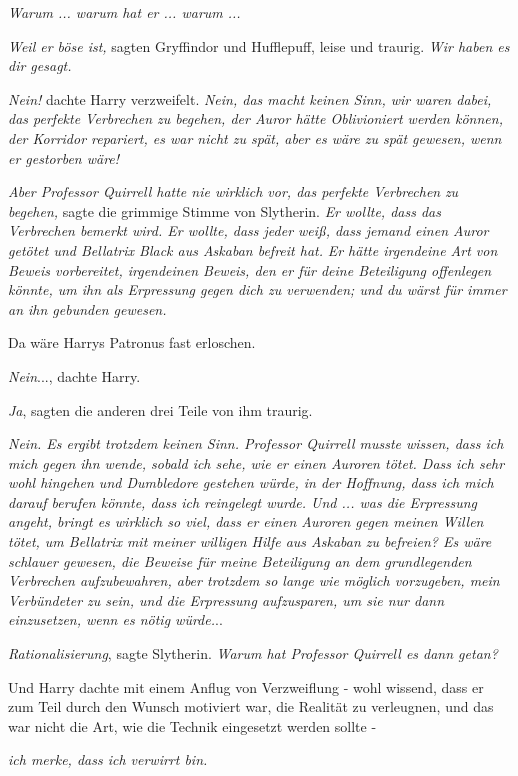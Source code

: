 \emph{Warum ... warum hat er ... warum ...}

\emph{Weil er böse ist,} sagten Gryffindor und Hufflepuff, leise und traurig.
\emph{Wir haben es dir gesagt.}

\emph{Nein!} dachte Harry verzweifelt. \emph{Nein, das macht keinen Sinn, wir
waren dabei, das perfekte Verbrechen zu begehen, der Auror hätte Oblivioniert
werden können, der Korridor repariert, es war nicht zu spät, aber es wäre zu
spät gewesen, wenn er gestorben wäre!}

\emph{Aber Professor Quirrell hatte nie wirklich vor, das perfekte Verbrechen}
\emph{zu begehen,} sagte die grimmige Stimme von Slytherin. \emph{Er wollte,
dass das Verbrechen bemerkt wird. Er wollte, dass jeder weiß, dass jemand einen
Auror getötet und Bellatrix Black aus Askaban befreit hat.} \emph{Er hätte
irgendeine Art von} \emph{Beweis vorbereitet, irgendeinen Beweis, den er für
deine Beteiligung offenlegen könnte, um ihn als Erpressung gegen dich zu
verwenden; und du wärst für immer an ihn gebunden gewesen.}

Da wäre Harrys Patronus fast erloschen.

\emph{Nein}..., dachte Harry.

\emph{Ja}, sagten die anderen drei Teile von ihm traurig.

\emph{Nein. Es ergibt trotzdem keinen Sinn. Professor Quirrell musste wissen,
dass ich mich gegen ihn wende, sobald ich sehe, wie er einen Auroren tötet. Dass
ich sehr wohl hingehen und Dumbledore gestehen würde, in der Hoffnung, dass ich
mich darauf berufen könnte, dass ich reingelegt wurde. Und ... was die Erpressung
angeht, bringt es wirklich so viel, dass er einen Auroren gegen meinen Willen
tötet, um Bellatrix mit meiner willigen Hilfe aus Askaban zu befreien? Es wäre
schlauer gewesen, die Beweise für meine Beteiligung an dem grundlegenden
Verbrechen aufzubewahren, aber trotzdem so lange wie möglich vorzugeben, mein
Verbündeter zu sein, und die Erpressung aufzusparen, um sie nur dann
einzusetzen, wenn es nötig würde.}..

\emph{Rationalisierung}, sagte Slytherin. \emph{Warum hat Professor Quirrell es
dann getan?}

Und Harry dachte mit einem Anflug von Verzweiflung - wohl wissend, dass er zum
Teil durch den Wunsch motiviert war, die Realität zu verleugnen, und das war
nicht die Art, wie die Technik eingesetzt werden sollte -

\emph{ich merke, dass ich verwirrt bin.}

